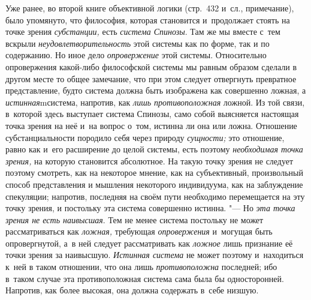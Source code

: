 Уже ранее, во второй книге объективной логики (стр.~432 и~сл., примечание),
было упомянуто, что философия, которая становится и~продолжает стоять на
точке зрения {\em субстанции,} есть {\em система Спинозы}. Там же мы вместе
с~тем вскрыли {\em неудовлетворительность} этой системы как по форме, так и
по содержанию. Но иное дело {\em опровержение} этой системы. Относительно
опровержения какой-либо философской системы мы равным образом сделали в
другом месте то общее замечание, что при этом следует отвергнуть превратное
представление, будто система должна быть изображена как совершенно ложная,
а {\em истинная}mсистема, напротив, как {\em лишь противоположная} ложной.
Из той связи, в~которой здесь выступает система Спинозы, само собой
выясняется настоящая точка зрения на неё и~на вопрос о~том, истинна ли она
или ложна. Отношение субстанциальности породило себя через природу
{\em сущности;} это отношение, равно как и~его расширение до целой системы,
есть поэтому {\em необходимая точка зрения,} на которую становится
абсолютное. На такую точку зрения не следует поэтому смотреть, как на
некоторое мнение, как на субъективный, произвольный способ представления и
мышления некоторого индивидуума, как на заблуждение спекуляции; напротив,
последняя на своём пути необходимо перемещается на эту точку зрения, и
постольку эта система совершенно истинна. "--- Но {\em эта точка зрения не есть
наивысшая}. Тем не менее система постольку не может рассматриваться как
{\em ложная,} требующая {\em опровержения} и~могущая быть опровергнутой, а~в
ней следует рассматривать как {\em ложное} лишь признание её точки зрения за
наивысшую. {\em Истинная система} не может поэтому и~находиться к~ней в
таком отношении, что она лишь {\em противоположна} последней; ибо в~таком
случае эта противоположная система сама была бы односторонней. Напротив, как
более высокая, она должна содержать в~себе низшую.

